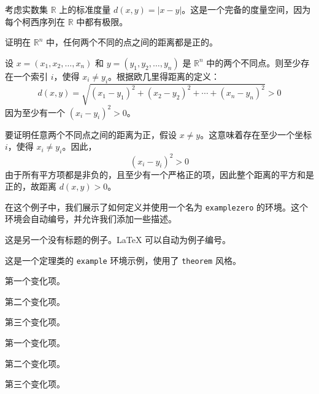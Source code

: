 \documentclass[12pt, a4paper, oneside, UTF8]{ctexbook}
\begin{document}
	\begin{example}
		考虑实数集 $\mathbb{R}$ 上的标准度量 $d(x, y) = |x - y|$。这是一个完备的度量空间，因为每个柯西序列在 $\mathbb{R}$ 中都有极限。
	\end{example}
	
	\begin{problem}
		证明在 $\mathbb{R}^n$ 中，任何两个不同的点之间的距离都是正的。
	\end{problem}
	
	\begin{answer}
		设 $x = (x_1, x_2, \ldots, x_n)$ 和 $y = (y_1, y_2, \ldots, y_n)$ 是 $\mathbb{R}^n$ 中的两个不同点。则至少存在一个索引 $i$，使得 $x_i \neq y_i$。根据欧几里得距离的定义：
		\[
		d(x, y) = \sqrt{(x_1 - y_1)^2 + (x_2 - y_2)^2 + \cdots + (x_n - y_n)^2} > 0
		\]
		因为至少有一个 $(x_i - y_i)^2 > 0$。
	\end{answer}
	
	\begin{solution}
		要证明任意两个不同点之间的距离为正，假设 $x \neq y$。这意味着存在至少一个坐标 $i$，使得 $x_i \neq y_i$。因此，
		\[
		(x_i - y_i)^2 > 0
		\]
		由于所有平方项都是非负的，且至少有一个严格正的项，因此整个距离的平方和是正的，故距离 $d(x, y) > 0$。
	\end{solution}
	
	
	\begin{examplezero}[这是一个简单的例子]
		在这个例子中，我们展示了如何定义并使用一个名为 \texttt{examplezero} 的环境。这个环境会自动编号，并允许我们添加一些描述。
	\end{examplezero}
	
	\begin{examplezero}
		这是另一个没有标题的例子。LaTeX 可以自动为例子编号。
	\end{examplezero}
	
	
	\begin{example}
		这是一个定理类的 \texttt{example} 环境示例，使用了 \texttt{theorem} 风格。
	\end{example}


	\begin{change}
		\item 第一个变化项。
		\item 第二个变化项。
		\item 第三个变化项。
	\end{change}
	
	
	\begin{change2}
		\item 第一个变化项。
		\item 第二个变化项。
		\item 第三个变化项。
	\end{change2}
	
\end{document}

